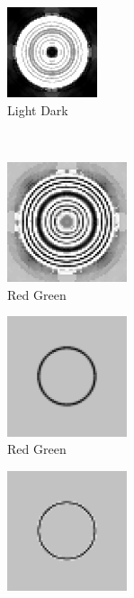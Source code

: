 \documentclass[journal,onecolumn]{IEEEtran}
\begin{document}
{\begin{figure}[H]
\begin{subfigure}[b]{0.25\textwidth}
    \end{subfigure}%
    \begin{subfigure}[b]{0.25\textwidth}
            \centering
            \includegraphics[width=100px, frame]{test-circle-a2-dwt-ld}
            \caption{Light Dark}
            \label{fig:test-circle-a2-dwt-ld}
    \end{subfigure}\\
    \begin{subfigure}[b]{0.25\textwidth}
            \centering
            \includegraphics[width=100pt, frame]{test-circle-a1-dwt-rg}
            \caption{Red Green}
            \label{fig:test-circle-a1-dwt-rg}
    \end{subfigure}%
    \begin{subfigure}[b]{0.25\textwidth}
            \centering
            \includegraphics[width=100pt, frame]{test-circle-a1-dwt-rg-mask}
            \caption{Red Green}
            \label{fig:test-circle-a1-dwt-rg-mask}
    \end{subfigure}%
    \begin{subfigure}[b]{0.25\textwidth}
            \centering
            \includegraphics[width=100pt, frame]{test-circle-a2-dwt-rg-mask}

\end{subfigure}
\end{figure}}
\end{document}

